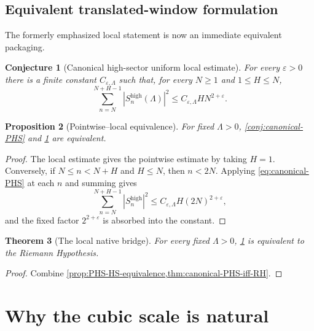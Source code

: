 \documentclass[11pt]{article}
\newtheorem{theorem}{Theorem}[section]
\newtheorem{proposition}[theorem]{Proposition}
\newtheorem{conjecture}[theorem]{Conjecture}
\theoremstyle{definition}
\theoremstyle{remark}
\newcommand{\eps}{\varepsilon}
\newcommand{\1}{\mathbf{1}}
\begin{document}
\subsection{Equivalent translated-window formulation}

The formerly emphasized local statement is now an immediate equivalent packaging.

\begin{conjecture}[Canonical high-sector uniform local estimate]
\label{conj:canonical-HS}
For every $\eps>0$ there is a finite constant $C_{\eps,\Lambda}$ such that, for every $N\ge1$ and $1\le H\le N$,
\begin{equation}
 \boxed{
 \sum_{n=N}^{N+H-1}
 \left|S_n^{\mathrm{high}}(\Lambda)\right|^2
 \le C_{\eps,\Lambda}HN^{2+\eps}.
 }
 \tag{HS}
 \label{eq:canonical-HS}
\end{equation}
\end{conjecture}

\begin{proposition}[Pointwise--local equivalence]
\label{prop:PHS-HS-equivalence}
For fixed $\Lambda>0$, \cref{conj:canonical-PHS} and \cref{conj:canonical-HS} are equivalent.
\end{proposition}

\begin{proof}
The local estimate gives the pointwise estimate by taking $H=1$.  Conversely, if $N\le n<N+H$ and $H\le N$, then $n<2N$.  Applying \cref{eq:canonical-PHS} at each $n$ and summing gives
\[
 \sum_{n=N}^{N+H-1}|S_n^{\mathrm{high}}|^2
 \le C_{\eps,\Lambda}H(2N)^{2+\eps},
\]
and the fixed factor $2^{2+\eps}$ is absorbed into the constant.
\end{proof}

\begin{theorem}[The local native bridge]
\label{thm:canonical-HS-iff-RH}
For every fixed $\Lambda>0$, \cref{conj:canonical-HS} is equivalent to the Riemann Hypothesis.
\end{theorem}

\begin{proof}
Combine \cref{prop:PHS-HS-equivalence,thm:canonical-PHS-iff-RH}.
\end{proof}

\section{Why the cubic scale is natural}
\label{sec:exponent-accounting}
\end{document}
